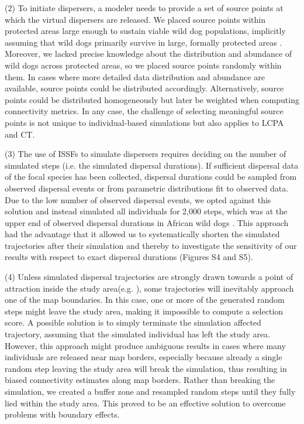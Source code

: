 \documentclass[abstract=on,10pt,a4paper,bibliography=totocnumbered]{article}
\begin{document}
(2) To initiate dispersers, a modeler needs to provide a set of source points at
which the virtual dispersers are released. We placed source points within
protected areas large enough to sustain viable wild dog populations, implicitly
assuming that wild dogs primarily survive in large, formally protected areas
\citep{DaviesMostert.2012, Woodroffe.2012, VanDerMeer.2014}. Moreover, we lacked
precise knowledge about the distribution and abundance of wild dogs across
protected areas, so we placed source points randomly within them. In cases where
more detailed data distribution and abundance are available, source points could
be distributed accordingly. Alternatively, source points could be distributed
homogeneously but later be weighted when computing connectivity metrics. In any
case, the challenge of selecting meaningful source points is not unique to
individual-based simulations but also applies to LCPA and CT.

(3) The use of ISSFs to simulate dispersers requires deciding on the number of
simulated steps (i.e. the simulated dispersal durations). If sufficient
dispersal data of the focal species has been collected, dispersal durations
could be sampled from observed dispersal events or from parametric distributions
fit to observed data. Due to the low number of observed dispersal events, we
opted against this solution and instead simulated all individuals for 2,000
steps, which was at the upper end of observed dispersal durations in African
wild dogs \citep{DaviesMostert.2012, Masenga.2016, Cozzi.2020, Hofmann.2021}.
This approach had the advantage that it allowed us to systematically shorten the
simulated trajectories after their simulation and thereby to investigate the
sensitivity of our results with respect to exact dispersal durations (Figures S4
and S5).

(4) Unless simulated dispersal trajectories are strongly drawn towards a point
of attraction inside the study area(e.g. \citealp{Signer.2017}), some
trajectories will inevitably approach one of the map boundaries. In this case,
one or more of the generated random steps might leave the study area, making it
impossible to compute a selection score. A possible solution is to simply
terminate the simulation affected trajectory, assuming that the simulated
individual has left the study area. However, this approach might produce
ambiguous results in cases where many individuals are released near map borders,
especially because already a single random step leaving the study area will
break the simulation, thus resulting in biased connectivity estimates along map
borders. Rather than breaking the simulation, we created a buffer zone
\citep{Koen.2010} and resampled random steps until they fully lied within the
study area. This proved to be an effective solution to overcome problems with
boundary effects.
\end{document}
